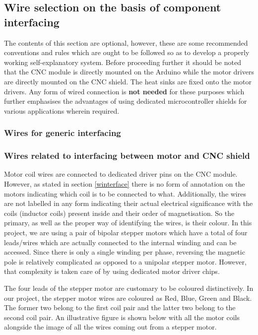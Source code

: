 \subsection{Wire selection on the basis of component interfacing}

The contents of this section are optional, however, these are some recommended conventions and rules which are ought to be followed so as to develop a properly working self-explanatory system. Before proceeding further it should be noted that the CNC module is directly mounted on the Arduino while the motor drivers are directly mounted on the CNC shield. The heat sinks are fixed onto the motor drivers. Any form of wired connection is \textbf{not needed} for these purposes which further emphasises the advantages of using dedicated microcontroller shields for various applications wherein required.

\subsubsection*{Wires for generic interfacing}

\subsubsection*{Wires related to interfacing between motor and CNC shield}

Motor coil wires are connected to dedicated driver pins on the CNC module. However, as stated in section \ref{winterface} there is no form of annotation on the motors indicating which coil is to be connected to what. Additionally, the wires are not labelled in any form indicating their actual electrical significance with the coils (inductor coils) present inside and their order of magnetisation. So the primary, as well as the proper way of identifying the wires, is their colour. In this project, we are using a pair of bipolar stepper motors which have a total of four leads/wires which are actually connected to the internal winding and can be accessed. Since there is only a single winding per phase, reversing the magnetic pole is relatively complicated as opposed to a unipolar stepper motor. However, that complexity is taken care of by using dedicated motor driver chips. \par

The four leads of the stepper motor are customary to be coloured distinctively. In our project, the stepper motor wires are coloured as Red, Blue, Green and Black. The former two belong to the first coil pair and the latter two belong to the second coil pair. An illustrative figure is shown below with all the motor coils alongside the image of all the wires coming out from a stepper motor.

